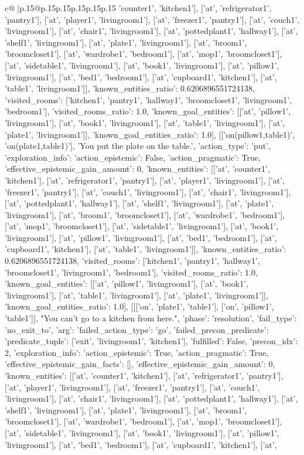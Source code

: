 \documentclass{article}
\begin{document}
{\begin{supertabular}{c@{$\;$}|p{.15\linewidth}@{}p{.15\linewidth}p{.15\linewidth}p{.15\linewidth}p{.15\linewidth}p{.15\linewidth}}
{{{'counter1', 'kitchen1'], ['at', 'refrigerator1', 'pantry1'], ['at', 'player1', 'livingroom1'], ['at', 'freezer1', 'pantry1'], ['at', 'couch1', 'livingroom1'], ['at', 'chair1', 'livingroom1'], ['at', 'pottedplant1', 'hallway1'], ['at', 'shelf1', 'livingroom1'], ['at', 'plate1', 'livingroom1'], ['at', 'broom1', 'broomcloset1'], ['at', 'wardrobe1', 'bedroom1'], ['at', 'mop1', 'broomcloset1'], ['at', 'sidetable1', 'livingroom1'], ['at', 'book1', 'livingroom1'], ['at', 'pillow1', 'livingroom1'], ['at', 'bed1', 'bedroom1'], ['at', 'cupboard1', 'kitchen1'], ['at', 'table1', 'livingroom1']], 'known_entities_ratio': 0.6206896551724138, 'visited_rooms': ['kitchen1', 'pantry1', 'hallway1', 'broomcloset1', 'livingroom1', 'bedroom1'], 'visited_rooms_ratio': 1.0, 'known_goal_entities': [['at', 'pillow1', 'livingroom1'], ['at', 'book1', 'livingroom1'], ['at', 'table1', 'livingroom1'], ['at', 'plate1', 'livingroom1']], 'known_goal_entities_ratio': 1.0}}], [['on(pillow1,table1)', 'on(plate1,table1)'], 'You put the plate on the table.', {'action_type': 'put', 'exploration_info': {'action_epistemic': False, 'action_pragmatic': True, 'effective_epistemic_gain_amount': 0, 'known_entities': [['at', 'counter1', 'kitchen1'], ['at', 'refrigerator1', 'pantry1'], ['at', 'player1', 'livingroom1'], ['at', 'freezer1', 'pantry1'], ['at', 'couch1', 'livingroom1'], ['at', 'chair1', 'livingroom1'], ['at', 'pottedplant1', 'hallway1'], ['at', 'shelf1', 'livingroom1'], ['at', 'plate1', 'livingroom1'], ['at', 'broom1', 'broomcloset1'], ['at', 'wardrobe1', 'bedroom1'], ['at', 'mop1', 'broomcloset1'], ['at', 'sidetable1', 'livingroom1'], ['at', 'book1', 'livingroom1'], ['at', 'pillow1', 'livingroom1'], ['at', 'bed1', 'bedroom1'], ['at', 'cupboard1', 'kitchen1'], ['at', 'table1', 'livingroom1']], 'known_entities_ratio': 0.6206896551724138, 'visited_rooms': ['kitchen1', 'pantry1', 'hallway1', 'broomcloset1', 'livingroom1', 'bedroom1'], 'visited_rooms_ratio': 1.0, 'known_goal_entities': [['at', 'pillow1', 'livingroom1'], ['at', 'book1', 'livingroom1'], ['at', 'table1', 'livingroom1'], ['at', 'plate1', 'livingroom1']], 'known_goal_entities_ratio': 1.0}}], [[['on', 'plate1', 'table1'], ['on', 'pillow1', 'table1']], "You can't go to a kitchen from here.", {'phase': 'resolution', 'fail_type': 'no_exit_to', 'arg': {'failed_action_type': 'go', 'failed_precon_predicate': {'predicate_tuple': ['exit', 'livingroom1', 'kitchen1'], 'fulfilled': False, 'precon_idx': 2}}, 'exploration_info': {'action_epistemic': True, 'action_pragmatic': True, 'effective_epistemic_gain_facts': [], 'effective_epistemic_gain_amount': 0, 'known_entities': [['at', 'counter1', 'kitchen1'], ['at', 'refrigerator1', 'pantry1'], ['at', 'player1', 'livingroom1'], ['at', 'freezer1', 'pantry1'], ['at', 'couch1', 'livingroom1'], ['at', 'chair1', 'livingroom1'], ['at', 'pottedplant1', 'hallway1'], ['at', 'shelf1', 'livingroom1'], ['at', 'plate1', 'livingroom1'], ['at', 'broom1', 'broomcloset1'], ['at', 'wardrobe1', 'bedroom1'], ['at', 'mop1', 'broomcloset1'], ['at', 'sidetable1', 'livingroom1'], ['at', 'book1', 'livingroom1'], ['at', 'pillow1', 'livingroom1'], ['at', 'bed1', 'bedroom1'], ['at', 'cupboard1', 'kitchen1'], ['at', }}}
\end{supertabular}}
\end{document}
